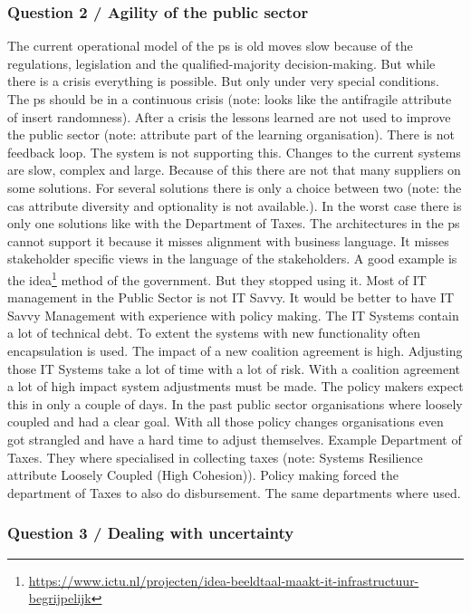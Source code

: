 \subsubsection{Question 2 / Agility of the public sector}
The current operational model of the \gls{ps} is old moves slow because of the regulations, legislation and the qualified-majority decision-making. But while there is a crisis everything is possible. But only under very special conditions. The \acrshort{ps} should be in a continuous crisis (note: looks like the \gls{antifragile} attribute of insert randomness). After a crisis the lessons learned are not used to improve the public sector (note: attribute part of the learning organisation). There is not feedback loop. The system is not supporting this. Changes to the current systems are slow, complex and large. Because of this there are not that many suppliers on some solutions. For several solutions there is only a choice between two (note: the \acrshort{cas} attribute diversity and optionality is not available.). In the worst case there is only one solutions like with the Department of Taxes. The architectures in the \acrshort{ps} cannot support it because it misses alignment with business language. It misses stakeholder specific views in the language of the stakeholders. A good example is the \acrfull{idea}\footnote{\url{https://www.ictu.nl/projecten/idea-beeldtaal-maakt-it-infrastructuur-begrijpelijk}} method of the government. But they stopped using it. 
Most of IT management in the Public Sector is not IT Savvy. It would be better to have IT Savvy Management with experience with policy making. The IT Systems contain a lot of technical debt. To extent the systems with new functionality often encapsulation is used. The impact of a new coalition agreement is high. Adjusting those IT Systems take a lot of time with a lot of risk. With a coalition agreement a lot of high impact system adjustments must be made. The policy makers expect this in only a couple of days. In the past public sector organisations where loosely coupled and had a clear goal. With all those policy changes organisations even got strangled and have a hard time to adjust themselves. Example Department of Taxes. They where specialised in collecting taxes (note: Systems Resilience attribute Loosely Coupled (High Cohesion)). Policy making forced the department of Taxes to also do disbursement. The same departments where used.

\subsubsection{Question 3 / Dealing with uncertainty}



